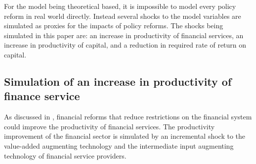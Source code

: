 \documentclass[AER]{AEA}
\begin{document}
For the model being theoretical based, it is impossible to model every 
policy reform in real world directly. Instead several shocks to the 
model variables are simulated as proxies for the impacts of policy 
reforms. The shocks being simulated in this paper are:  
an increase in productivity of financial services, 
an increase in productivity of capital, and 
a reduction in required rate of return on capital.\\

\subsection{Simulation of an increase in productivity of finance service}
\label{sec:sim2}

As discussed in , financial reforms that reduce restrictions 
on the financial system could improve the productivity of financial services. 
The productivity improvement of the financial sector is simulated by 
an incremental shock to the value-added augmenting technology and the 
intermediate input augmenting technology of financial service providers. 





\end{document}
